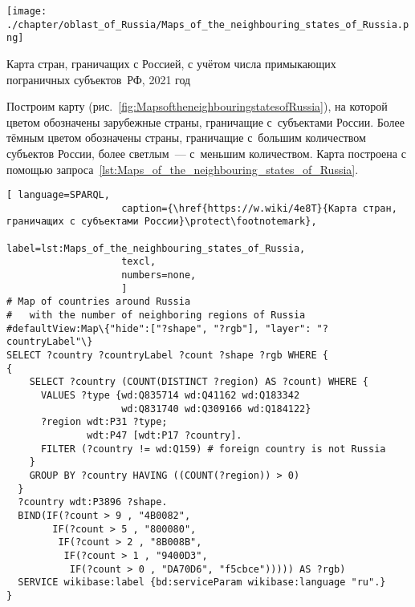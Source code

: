 \newpage
\begin{marginfigure}[0\baselineskip]
	\texttt{[image: ./chapter/oblast\_of\_Russia/Maps\_of\_the\_neighbouring\_states\_of\_Russia.png]}
	\caption[Карта стран, граничащих с Россией, 2021 год.]
    {Карта стран, граничащих с Россией, 
     с учётом числа примыкающих\\пограничных субъектов~РФ, 2021 год}%
      \label{fig:MapsoftheneighbouringstatesofRussia}%
\end{marginfigure} 
Построим карту (рис.~\ref{fig:MapsoftheneighbouringstatesofRussia}), 
на которой цветом обозначены зарубежные страны, 
граничащие с~субъектами России. 
Более тёмным цветом обозначены страны, 
граничащие с~большим количеством субъектов России, 
более светлым~--- с~меньшим количеством. 
Карта построена с помощью запроса~\protect\ref{lst:Maps_of_the_neighbouring_states_of_Russia}.

\lstset{numbers=left, firstnumber=1, frame=single}
\begin{lstlisting}[ language=SPARQL, 
                    caption={\href{https://w.wiki/4e8T}{Карта стран, граничащих с субъектами России}\protect\footnotemark},
                    label=lst:Maps_of_the_neighbouring_states_of_Russia,
                    texcl,
                    numbers=none,
                    ]
# Map of countries around Russia 
#   with the number of neighboring regions of Russia
#defaultView:Map\{"hide":["?shape", "?rgb"], "layer": "?countryLabel"\}
SELECT ?country ?countryLabel ?count ?shape ?rgb WHERE {
{
    SELECT ?country (COUNT(DISTINCT ?region) AS ?count) WHERE {
      VALUES ?type {wd:Q835714 wd:Q41162 wd:Q183342 
                    wd:Q831740 wd:Q309166 wd:Q184122}
      ?region wdt:P31 ?type;
              wdt:P47 [wdt:P17 ?country].
      FILTER (?country != wd:Q159) # foreign country is not Russia
    }
    GROUP BY ?country HAVING ((COUNT(?region)) > 0)
  }
  ?country wdt:P3896 ?shape.
  BIND(IF(?count > 9 , "4B0082", 
        IF(?count > 5 , "800080", 
         IF(?count > 2 , "8B008B", 
          IF(?count > 1 , "9400D3", 
           IF(?count > 0 , "DA70D6", "f5cbce"))))) AS ?rgb)
  SERVICE wikibase:label {bd:serviceParam wikibase:language "ru".}
}
\end{lstlisting}%



